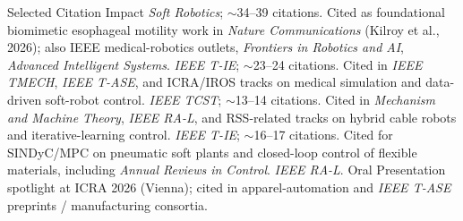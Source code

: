 \begin{rubric}{Selected Citation Impact}
    \entry*[RoSE (2021)]%
        \textit{Soft Robotics}; $\sim$34--39 citations. Cited as foundational biomimetic esophageal motility work in \textit{Nature Communications} (Kilroy et al., 2026); also IEEE medical-robotics outlets, \textit{Frontiers in Robotics and AI}, \textit{Advanced Intelligent Systems}.
    \entry*[Sparse ID (2020)]%
        \textit{IEEE T-IE}; $\sim$23--24 citations. Cited in \textit{IEEE TMECH}, \textit{IEEE T-ASE}, and ICRA/IROS tracks on medical simulation and data-driven soft-robot control.
        \textit{IEEE TCST}; $\sim$13--14 citations. Cited in \textit{Mechanism and Machine Theory}, \textit{IEEE RA-L}, and RSS-related tracks on hybrid cable robots and iterative-learning control.
        \textit{IEEE T-IE}; $\sim$16--17 citations. Cited for SINDyC/MPC on pneumatic soft plants and closed-loop control of flexible materials, including \textit{Annual Reviews in Control}.
    \entry*[Sewing (2025)]%
        \textit{IEEE RA-L}. Oral Presentation spotlight at ICRA 2026 (Vienna); cited in apparel-automation and \textit{IEEE T-ASE} preprints / manufacturing consortia.
\end{rubric}
